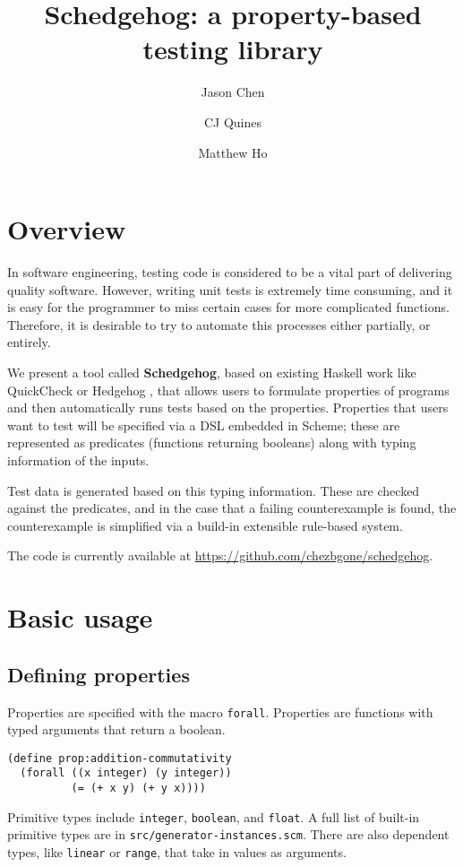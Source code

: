 \documentclass{scrartcl}
\title{Schedgehog: a property-based testing library}
\author{Jason Chen \and CJ Quines \and Matthew Ho}
\begin{document}
\maketitle

\section{Overview}

In software engineering, testing code is considered to be a vital part of
delivering quality software. However, writing unit tests is extremely time
consuming, and it is easy for the programmer to miss certain cases for more
complicated functions. Therefore, it is desirable to try to automate this
processes either partially, or entirely.

We present a tool called \textbf{Schedgehog}, based on existing Haskell work
like QuickCheck \cite{quickcheck} or Hedgehog \cite{hedgehog}, that allows
users to formulate properties of programs and then automatically runs tests
based on the properties. Properties that users want to test will be specified
via a DSL embedded in Scheme; these are represented as predicates (functions
returning booleans) along with typing information of the inputs.

Test data is generated based on this typing information. These are checked
against the predicates, and in the case that a failing counterexample is found,
the counterexample is simplified via a build-in extensible rule-based system.

The code is currently available at
\url{https://github.com/chezbgone/schedgehog}.

\section{Basic usage}

\subsection{Defining properties}
Properties are specified with the macro \verb|forall|. Properties are functions
with typed arguments that return a boolean.

\begin{verbatim}
(define prop:addition-commutativity
  (forall ((x integer) (y integer))
          (= (+ x y) (+ y x))))
\end{verbatim}

Primitive types include \verb|integer|, \verb|boolean|, and \verb|float|. A full
list of built-in primitive types are in \verb|src/generator-instances.scm|.
There are also dependent types, like \verb|linear| or \verb|range|, that take
in values as arguments.
\end{document}
